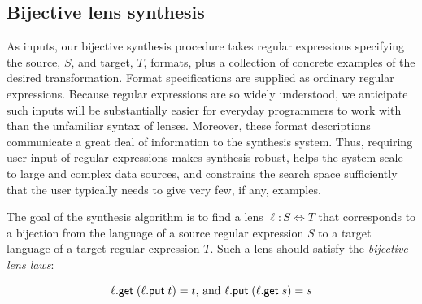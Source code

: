 \documentclass[12pt]{article}
\begin{document}
{\subsection{Bijective lens synthesis}

As inputs, our bijective synthesis procedure takes regular expressions specifying the
source, $S$, and
target, $T$, formats, plus a collection of concrete examples of the desired 
transformation.  Format specifications are supplied as ordinary regular
expressions.
Because regular expressions are so widely understood, we anticipate such
inputs will be substantially easier for everyday programmers to work with
than the unfamiliar syntax of lenses.
Moreover, these format descriptions communicate a
great deal of information to the synthesis system.  Thus, requiring user input
of regular expressions makes synthesis robust, 
helps the system scale to large and complex data sources, and 
constrains the search space sufficiently that the user typically needs
to give very few, if any, examples.

The goal of the synthesis algorithm is to find a lens
$\ell : S \Leftrightarrow T$ that corresponds to a bijection from the language
of a source regular expression $S$ to a target language of a target regular
expression $T$.   Such a lens should satisfy the \textit{bijective lens laws}:

\begin{equation}\label{bijectivelenslaws} \ell.\mathsf{get} \;
  (\ell.\mathsf{put} \; t) = t \text{, and } \ell.\mathsf{put} \; (\ell.\mathsf{get} \; s) = s
\end{equation}

\begin{figure}
  \centering
  \small 
\end{figure}}
\end{document}
